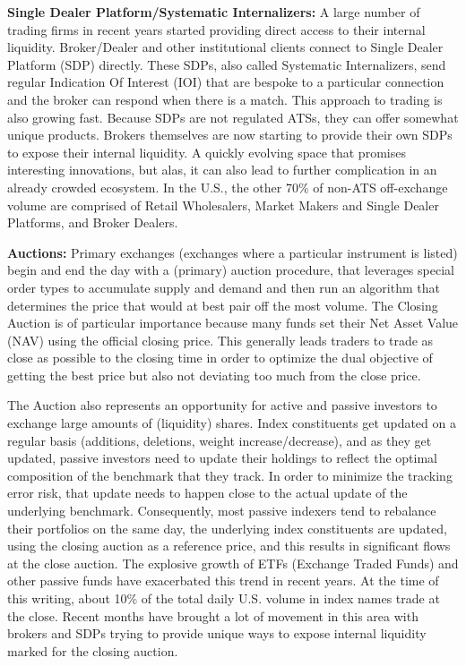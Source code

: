 \noindent\textbf{Single Dealer Platform/Systematic Internalizers:} A large number of trading firms in recent years started providing direct access to their internal liquidity. Broker/Dealer and other institutional clients connect to Single Dealer Platform (SDP) directly. These SDPs, also called Systematic Internalizers, send regular Indication Of Interest (IOI) that are bespoke to a particular connection and the broker can respond when there is a match. This approach to trading is also growing fast. Because SDPs are not regulated ATSs, they can offer somewhat unique products. Brokers themselves are now starting to provide their own SDPs to expose their internal liquidity. A quickly evolving space that promises interesting innovations, but alas, it can also lead to further complication in an already crowded ecosystem. In the U.S., the other 70\% of non-ATS off-exchange volume are comprised of Retail Wholesalers, Market Makers and Single Dealer Platforms, and Broker Dealers.\twomedskip


\noindent\textbf{Auctions:} Primary exchanges (exchanges where a particular instrument is listed) begin and end the day with a (primary) auction procedure, that leverages special order types to accumulate supply and demand and then run an algorithm that determines the price that would at best pair off the most volume. The Closing Auction is of particular importance because many funds set their Net Asset Value (NAV) using the official closing price. This generally leads traders to trade as close as possible to the closing time in order to optimize the dual objective of getting the best price but also not deviating too much from the close price. \label{in:close1}


The Auction also represents an opportunity for active and passive investors to exchange large amounts of (liquidity) shares. Index constituents get updated on a regular basis (additions, deletions, weight increase/decrease), and as they get updated, passive investors need to update their holdings to reflect the optimal composition of the benchmark that they track. In order to minimize the tracking error risk, that update needs to happen close to the actual update of the underlying benchmark. Consequently, most passive indexers tend to rebalance their portfolios on the same day, the underlying index constituents are updated, using the closing auction as a reference price, and this results in significant flows at the close auction. The explosive growth of ETFs (Exchange Traded Funds) and other passive funds have exacerbated this trend in recent years. At the time of this writing, about 10\% of the total daily U.S. volume in index names trade at the close. Recent months have brought a lot of movement in this area with brokers and SDPs trying to provide unique ways to expose internal liquidity marked for the closing auction. \twomedskip


